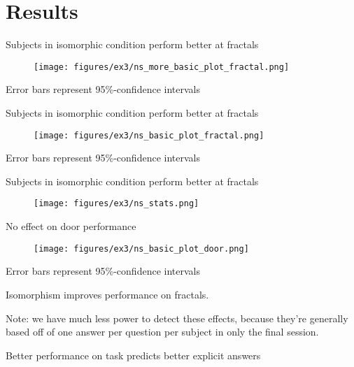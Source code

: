 \documentclass{beamer}
\begin{document}
\section{Results}

\begin{frame}[label=iso_bet_B]{Subjects in isomorphic condition perform better at fractals}
\begin{figure}
\centering
\texttt{[image: figures/ex3/ns\_more\_basic\_plot\_fractal.png]}
\end{figure}
{\scriptsize Error bars represent 95\%-confidence intervals}
\end{frame}

\begin{frame}{Subjects in isomorphic condition perform better at fractals}
\begin{figure}
\centering
\texttt{[image: figures/ex3/ns\_basic\_plot\_fractal.png]}
\end{figure}
{\scriptsize Error bars represent 95\%-confidence intervals}
\end{frame}

\begin{frame}{Subjects in isomorphic condition perform better at fractals}
\begin{figure}
\centering
\texttt{[image: figures/ex3/ns\_stats.png]}
\end{figure}
\end{frame}

\begin{frame}{No effect on door performance}
\begin{figure}
\centering
\texttt{[image: figures/ex3/ns\_basic\_plot\_door.png]}
\end{figure}
{\scriptsize Error bars represent 95\%-confidence intervals}
\end{frame}

\begin{frame}[standout]
Isomorphism improves performance on fractals.
\end{frame}


\begin{frame}
Note: we have much less power to detect these effects, because they're generally based off of one answer per question per subject in only the final session.
\end{frame}

\begin{frame}{Better performance on task predicts better explicit answers}
\begin{figure}
\centering
{} 
\end{figure}
\end{frame}
\end{document}
